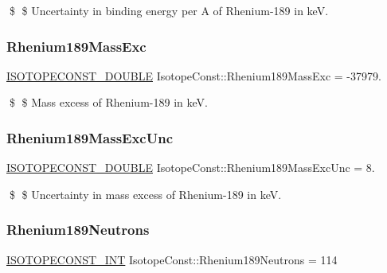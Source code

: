 \$ \$ Uncertainty in binding energy per A of Rhenium-\/189 in keV. \mbox{\label{group___isotope_const-_rhenium-_re189_gaa813f2a9c9f24d147c4f5f7748ced118}} 
\subsubsection{\texorpdfstring{Rhenium189\+Mass\+Exc}{Rhenium189MassExc}}
{\footnotesize\ttfamily \mbox{\hyperlink{group___isotope_const-_macros_ga8f45a7272ce02c0b4c65c44636ed719a}{I\+S\+O\+T\+O\+P\+E\+C\+O\+N\+S\+T\+\_\+\+D\+O\+U\+B\+LE}} Isotope\+Const\+::\+Rhenium189\+Mass\+Exc = -\/37979.}

\$ \$ Mass excess of Rhenium-\/189 in keV. \mbox{\label{group___isotope_const-_rhenium-_re189_gaa7f2d03b5e5d04dbf90f219ec85de4ce}} 
\subsubsection{\texorpdfstring{Rhenium189\+Mass\+Exc\+Unc}{Rhenium189MassExcUnc}}
{\footnotesize\ttfamily \mbox{\hyperlink{group___isotope_const-_macros_ga8f45a7272ce02c0b4c65c44636ed719a}{I\+S\+O\+T\+O\+P\+E\+C\+O\+N\+S\+T\+\_\+\+D\+O\+U\+B\+LE}} Isotope\+Const\+::\+Rhenium189\+Mass\+Exc\+Unc = 8.}

\$ \$ Uncertainty in mass excess of Rhenium-\/189 in keV. \mbox{\label{group___isotope_const-_rhenium-_re189_ga54e13c562f82cb0b92e77273e7c500f9}} 
\subsubsection{\texorpdfstring{Rhenium189\+Neutrons}{Rhenium189Neutrons}}
{\footnotesize\ttfamily \mbox{\hyperlink{group___isotope_const-_macros_ga5f18360b3e99483a35c32d789e62621c}{I\+S\+O\+T\+O\+P\+E\+C\+O\+N\+S\+T\+\_\+\+I\+NT}} Isotope\+Const\+::\+Rhenium189\+Neutrons = 114}

